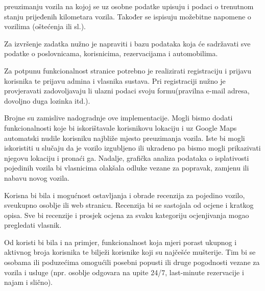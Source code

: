 preuzimanju vozila na kojoj se uz osobne podatke upisuju i podaci o trenutnom stanju
prijeđenih kilometara vozila. Također se ispisuju možebitne napomene o vozilima (oštećenja ili sl.).\par 
 \text Za izvršenje zadatka nužno je napraviti i bazu podataka koja će sadržavati sve podatke o poslovnicama, korisnicima, rezervacijama i automobilima. \par
 \text Za potpunu funkcionalnost stranice potrebno je realizirati registraciju i prijavu korisnika te prijavu admina i vlasnika sustava. Pri registraciji nužno je provjeravati zadovoljavaju li ulazni podaci svoju formu(pravilna e-mail adresa, dovoljno duga lozinka itd.).\par
 \text Brojne su zamislive nadogradnje ove implementacije. Mogli bismo dodati funkcionalnosti koje bi iskorištavale korisnikovu lokaciju i uz Google Maps automatski nudile korisniku najbliže mjesto preuzimanja vozila. Iste bi mogli iskoristiti u slučaju da je vozilo izgubljeno ili ukradeno pa bismo mogli prikazivati njegovu lokaciju i pronaći ga. 
\text Nadalje, grafička analiza podataka o isplativosti pojedinih vozila bi vlasnicima olakšala odluke vezane za popravak, zamjenu ili nabavu novog vozila. \par 
\text Korisna bi bila i mogućnost ostavljanja i obrade recenzija za pojedino vozilo, sveukupno osoblje ili web stranicu. Recenzija bi se sastojala od ocjene i kratkog opisa. Sve bi recenzije i prosjek ocjena za svaku kategoriju ocjenjivanja mogao pregledati vlasnik. \par 
\text Od koristi bi bila i na primjer, funkcionalnost koja mjeri porast ukupnog i aktivnog broja korisnika te bilježi korisnike koji su najčešće mušterije. Tim bi se osobama ili poduzećima omogućili posebni popusti ili druge pogodnosti vezane za vozila i usluge (npr. osoblje odgovara na upite 24/7, last-minute rezervacije i najam i slično).   \par  
		\eject
		
		
		
	